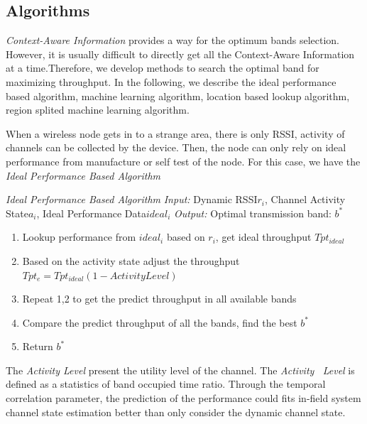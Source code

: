 
\subsection{Algorithms}
\label{subsec:algorithms}

\emph{Context-Aware Information} provides a way for the optimum bands selection. However, it is usually difficult to directly get all the Context-Aware Information at a time.Therefore, we develop methods to search the optimal band for maximizing throughput. In the following, we describe the ideal performance based algorithm, machine learning algorithm, location based lookup algorithm, region splited machine learning algorithm.

When a wireless node gets in to a strange area, there is only RSSI, activity of channels can be collected by the device. Then, the node can only rely on ideal performance from manufacture or self test of the node. For this case, we have the \emph{Ideal Performance Based Algorithm}

\emph{Ideal Performance Based Algorithm}
\emph{Input:} Dynamic RSSI$r_i$, Channel Activity State$a_i$, Ideal Performance Data$ideal_i$ 
\emph{Output:} Optimal transmission band: $b^*$

\begin{enumerate}
\item Lookup performance from $ideal_i$ based on $r_i$, get ideal throughput $Tpt_{ideal}$
\item Based on the activity state adjust the throughput $Tpt_e=Tpt_{ideal}(1-Activity Level)$
\item Repeat 1,2 to get the predict throughput in all available bands
\item Compare the predict throughput of all the bands, find the best $b^*$
\item Return $b^*$
\end{enumerate}

The \emph{Activity Level} present the utility level of the channel.
The \emph{Activity \, Level} is defined as a statistics of band occupied time ratio. Through the temporal correlation parameter, the prediction of the performance could fits in-field system channel state estimation better than only consider the dynamic channel state.

